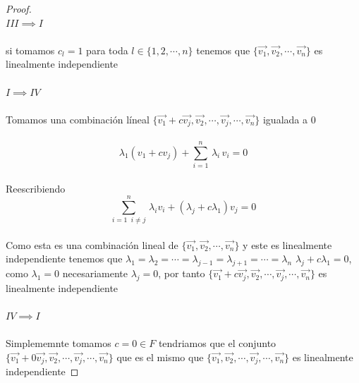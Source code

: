 \documentclass[11pt,letterpaper]{article}
\begin{document}
\begin{proof}
    \,\\
    $III\implies I$\,\\
    \,\\
    si tomamos $c_l=1$ para toda $l\in \{1,2,\cdots,n\}$ tenemos que $\{\vec{v_1},\vec{v_2},\cdots, \vec{v_n}\}$ es linealmente independiente\,\\
    \,\\
    $I\implies IV$\,\\
    \,\\
    Tomamos una combinaci\'on l\'ineal $\{\vec{v_1}+c\vec{v_j},\vec{v_2},\cdots,\vec{v_j},\cdots,\vec{v_n}\}$ igualada a $0$\,\\
    \,\\
    \begin{equation*}
        \lambda_1(v_1+cv_j)+\sum_{i=1}^{n}\,\lambda_i\,v_i=0
    \end{equation*}\,\\
    Reescribiendo\,\\
    \begin{equation*}
        \sum_{i=1\,\,\:i\neq j}^n\,\lambda_iv_i+(\lambda_j+c\lambda_1)v_j=0
    \end{equation*}\,\\
    Como esta es una combinaci\'on lineal de $\{\vec{v_1},\vec{v_2},\cdots, \vec{v_n}\}$ y este es linealmente independiente
    tenemos que $\lambda_1=\lambda_2=\cdots=\lambda_{j-1}=\lambda_{j+1}=\cdots=\lambda_n$ $\lambda_j+c\lambda_1=0$, como
    $\lambda_1=0$ necesariamente $\lambda_j=0$, por tanto $\{\vec{v_1}+c\vec{v_j},\vec{v_2},\cdots,\vec{v_j},\cdots,\vec{v_n}\}$ es linealmente 
    independiente\,\\
    \,\\
    $IV \implies I$\,\\
    \,\\
    Simplememnte tomamos $c=0\in F$ tendriamos que el conjunto $\{\vec{v_1}+0\vec{v_j},\vec{v_2},\cdots,\vec{v_j},\cdots,\vec{v_n}\}$ que es el mismo que
    $\{\vec{v_1},\vec{v_2},\cdots,\vec{v_j},\cdots,\vec{v_n}\}$ es linealmente independiente
\end{proof}
\end{document}
